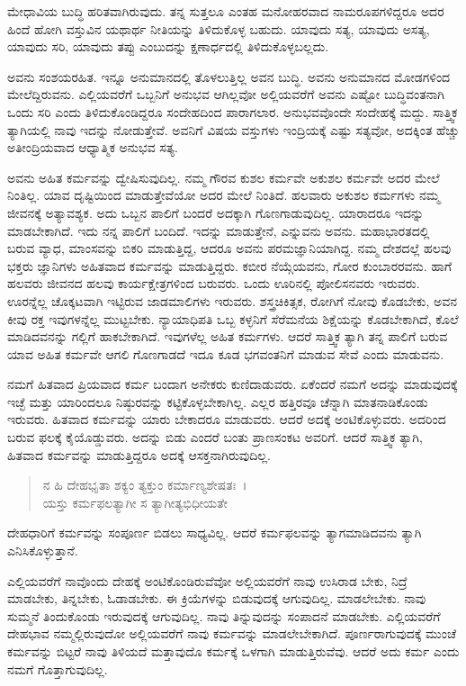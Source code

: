 ಮೇಧಾವಿಯ ಬುದ್ಧಿ ಹರಿತವಾಗಿರುವುದು. ತನ್ನ ಸುತ್ತಲೂ ಎಂತಹ ಮನೋಹರವಾದ ನಾಮರೂಪಗಳಿದ್ದರೂ ಅದರ ಹಿಂದೆ ಹೋಗಿ ವಸ್ತುವಿನ ಯಥಾರ್ಥ ನೀತಿಯನ್ನು ತಿಳಿದುಕೊಳ್ಳ ಬಹುದು. ಯಾವುದು ಸತ್ಯ, ಯಾವುದು ಅಸತ್ಯ, ಯಾವುದು ಸರಿ, ಯಾವುದು ತಪ್ಪು ಎಂಬುದನ್ನು ಕ್ಷಣಾರ್ಧದಲ್ಲಿ ತಿಳಿದುಕೊಳ್ಳಬಲ್ಲದು.

ಅವನು ಸಂಶಯರಹಿತ. ಇನ್ನೂ ಅನುಮಾನದಲ್ಲಿ ತೊಳಲುತ್ತಿಲ್ಲ ಅವನ ಬುದ್ಧಿ. ಅವನು ಅನುಮಾನದ ಮೋಡಗಳಿಂದ ಮೇಲೆದ್ದಿರುವನು. ಎಲ್ಲಿಯವರೆಗೆ ಒಬ್ಬನಿಗೆ ಅನುಭವ ಆಗಿಲ್ಲವೋ ಅಲ್ಲಿಯವರೆಗೆ ಅವನು ಎಷ್ಟೋ ಬುದ್ಧಿವಂತನಾಗಿ ಒಂದು ಸರಿ ಎಂದು ತಿಳಿದುಕೊಂಡಿದ್ದರೂ ಸಂದೇಹದಿಂದ ಪಾರಾಗಲಾರ. ಅನುಭವವೊಂದೇ ಸಂದೇಹಕ್ಕೆ ಮದ್ದು. ಸಾತ್ತ್ವಿಕ ತ್ಯಾಗಿಯಲ್ಲಿ ನಾವು ಇದನ್ನು ನೋಡುತ್ತೇವೆ. ಅವನಿಗೆ ವಿಷಯ ವಸ್ತುಗಳು ಇಂದ್ರಿಯಕ್ಕೆ ಎಷ್ಟು ಸತ್ಯವೋ, ಅದಕ್ಕಿಂತ ಹೆಚ್ಚು ಅತೀಂದ್ರಿಯವಾದ ಆಧ್ಯಾತ್ಮಿಕ ಅನುಭವ ಸತ್ಯ.

ಅವನು ಅಹಿತ ಕರ್ಮವನ್ನು ದ್ವೇಷಿಸುವುದಿಲ್ಲ. ನಮ್ಮ ಗೌರವ ಕುಶಲ ಕರ್ಮವೇ ಅಕುಶಲ ಕರ್ಮವೇ ಅದರ ಮೇಲೆ ನಿಂತಿಲ್ಲ. ಯಾವ ದೃಷ್ಟಿಯಿಂದ ಮಾಡುತ್ತೇವೆಯೋ ಅದರ ಮೇಲೆ ನಿಂತಿದೆ. ಹಲವಾರು ಅಕುಶಲ ಕರ್ಮಗಳು ನಮ್ಮ ಜೀವನಕ್ಕೆ ಅತ್ಯಾವಶ್ಯಕ. ಅದು ಒಬ್ಬನ ಪಾಲಿಗೆ ಬಂದರೆ ಅದಕ್ಕಾಗಿ ಗೊಣಗಾಡುವುದಿಲ್ಲ. ಯಾರಾದರೂ ಇದನ್ನು ಮಾಡಬೇಕಾಗಿದೆ. ಇದು ನನ್ನ ಪಾಲಿಗೆ ಬಂದಿದೆ. ಇದನ್ನು ಮಾಡುತ್ತೇನೆ, ಎನ್ನುವನು ಅವನು. ಮಹಾಭಾರತದಲ್ಲಿ ಬರುವ ವ್ಯಾಧ, ಮಾಂಸವನ್ನು ಬಿಕರಿ ಮಾಡುತ್ತಿದ್ದ, ಆದರೂ ಅವನು ಪರಮಜ್ಞಾನಿಯಾಗಿದ್ದ. ನಮ್ಮ ದೇಶದಲ್ಲೆ ಹಲವು ಭಕ್ತರು ಜ್ಞಾನಿಗಳು ಅಹಿತವಾದ ಕರ್ಮವನ್ನು ಮಾಡುತ್ತಿದ್ದರು. ಕಬೀರ ನೆಯ್ಗೆಯವನು, ಗೋರ ಕುಂಬಾರರವನು. ಹಾಗೆ ಹಲವರು ಜೀವನದ ಹಲವು ಕಾರ್ಯಕ್ಷೇತ್ರಗಳಿಂದ ಬರುವರು. ಒಂದು ಊರಿನಲ್ಲಿ ಪೋಲಿಸನವರು ಇರುವರು. ಊರನ್ನೆಲ್ಲ ಚೊಕ್ಕಟವಾಗಿ ಇಟ್ಟಿರುವ ಜಾಡಮಾಲಿಗಳು ಇರುವರು. ಶಸ್ತ್ರಚಿಕಿತ್ಸಕ, ರೋಗಿಗೆ ನೋವು ಕೊಡಬೇಕು, ಅವನ ಕೀವು ರಕ್ತ ಇವುಗಳನ್ನೆಲ್ಲ ಮುಟ್ಟಬೇಕು. ನ್ಯಾಯಾಧಿಪತಿ ಒಬ್ಬ ಕಳ್ಳನಿಗೆ ಸೆರೆಮನೆಯ ಶಿಕ್ಷೆಯನ್ನು ಕೊಡಬೇಕಾಗಿದೆ, ಕೊಲೆ ಮಾಡಿದವನನ್ನು ಗಲ್ಲಿಗೆ ಹಾಕಬೇಕಾಗಿದೆ. ಇವುಗಳೆಲ್ಲ ಅಹಿತ ಕರ್ಮಗಳು. ಆದರೆ ಸಾತ್ತ್ವಿಕ ತ್ಯಾಗಿ ತನ್ನ ಪಾಲಿಗೆ ಬರುವ ಯಾವ ಅಹಿತ ಕರ್ಮವೇ ಆಗಲಿ ಗೊಣಗಾಡದೆ ಇದೂ ಕೂಡ ಭಗವಂತನಿಗೆ ಮಾಡುವ ಸೇವೆ ಎಂದು ಮಾಡುವನು.

ನಮಗೆ ಹಿತವಾದ ಪ್ರಿಯವಾದ ಕರ್ಮ ಬಂದಾಗ ಅನೇಕರು ಕುಣಿದಾಡುವರು. ಏಕೆಂದರೆ ನಮಗೆ ಅದನ್ನು ಮಾಡುವುದಕ್ಕೆ ಇಚ್ಛೆ ಮತ್ತು ಯಾರಿಂದಲೂ ನಿಷ್ಠುರವನ್ನು ಕಟ್ಟಿಕೊಳ್ಳಬೇಕಾಗಿಲ್ಲ. ಎಲ್ಲರ ಹತ್ತಿರವೂ ಚೆನ್ನಾಗಿ ಮಾತನಾಡಿಕೊಂಡು ಇರುವರು. ಹಿತವಾದ ಕರ್ಮವನ್ನು ಯಾರು ಬೇಕಾದರೂ ಮಾಡುವರು. ಆದರೆ ಅದಕ್ಕೆ ಅಂಟಿಕೊಳ್ಳುವರು. ಅದರಿಂದ ಬರುವ ಫಲಕ್ಕೆ ಕೈಯೊಡ್ಡುವರು. ಅದನ್ನು ಬಿಡು ಎಂದರೆ ಬಂತು ಪ್ರಾಣಸಂಕಟ ಅವರಿಗೆ. ಆದರೆ ಸಾತ್ತ್ವಿಕ ತ್ಯಾಗಿ, ಹಿತವಾದ ಕರ್ಮವನ್ನು ಮಾಡುತ್ತಿದ್ದರೂ ಅದಕ್ಕೆ ಆಸಕ್ತನಾಗಿರುವುದಿಲ್ಲ.

\begin{verse}
ನ ಹಿ ದೇಹಭೃತಾ ಶಕ್ಯಂ ತ್ಯಕ್ತುಂ ಕರ್ಮಾಣ್ಯಶೇಷತಃ~।\\ಯಸ್ತು ಕರ್ಮಫಲತ್ಯಾಗೀ ಸ ತ್ಯಾಗೀತ್ಯಭಿಧೀಯತೇ 
\end{verse}

{\small ದೇಹಧಾರಿಗೆ ಕರ್ಮವನ್ನು ಸಂಪೂರ್ಣ ಬಿಡಲು ಸಾಧ್ಯವಿಲ್ಲ. ಆದರೆ ಕರ್ಮಫಲವನ್ನು ತ್ಯಾಗಮಾಡಿದವನು ತ್ಯಾಗಿ ಎನಿಸಿಕೊಳ್ಳುತ್ತಾನೆ.}

ಎಲ್ಲಿಯವರೆಗೆ ನಾವೊಂದು ದೇಹಕ್ಕೆ ಅಂಟಿಕೊಂಡಿರುವೆವೋ ಅಲ್ಲಿಯವರೆಗೆ ನಾವು ಉಸಿರಾಡ ಬೇಕು, ನಿದ್ರೆ ಮಾಡಬೇಕು, ತಿನ್ನಬೇಕು, ಓಡಾಡಬೇಕು. ಈ ಕ್ರಿಯೆಗಳನ್ನು ಬಿಡುವುದಕ್ಕೆ ಆಗುವುದಿಲ್ಲ. ಮಾಡಲೇಬೇಕು. ನಾವು ಸುಮ್ಮನೆ ತಿಂದುಕೊಂಡು ಇರುವುದಕ್ಕೆ ಆಗುವುದಿಲ್ಲ. ನಾವು ತಿನ್ನುವುದನ್ನು ಸಂಪಾದನೆ ಮಾಡಬೇಕು. ಎಲ್ಲಿಯವರೆಗೆ ದೇಹಭಾವ ನಮ್ಮಲ್ಲಿರುವುದೋ ಅಲ್ಲಿಯವರೆಗೆ ನಾವು ಕರ್ಮವನ್ನು ಮಾಡಲೇಬೇಕಾಗಿದೆ. ಪೂರ್ಣರಾಗುವುದಕ್ಕೆ ಮುಂಚೆ ಕರ್ಮವನ್ನು ಬಿಟ್ಟರೆ ನಾವು ತಿಳಿಯದೆ ಮತ್ತಾವುದೊ ಕರ್ಮಕ್ಕೆ ಒಳಗಾಗಿ ಮಾಡುತ್ತಿರುವೆವು. ಆದರೆ ಅದು ಕರ್ಮ ಎಂದು ನಮಗೆ ಗೊತ್ತಾಗುವುದಿಲ್ಲ.

